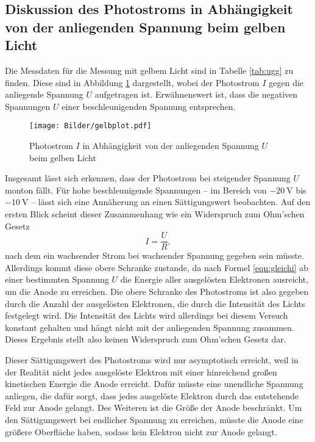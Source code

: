 \FloatBarrier
\subsection{Diskussion des Photostroms in Abhängigkeit von der anliegenden Spannung beim gelben Licht}

Die Messdaten für die Messung mit gelbem Licht sind in Tabelle \ref{tab:ugg} zu finden.
Diese sind in Abbildung \ref{fig:datayellow} dargestellt, wobei der Photostrom $I$ gegen die
anliegende Spannung $U$ aufgetragen ist. Erwähnenswert ist, dass die negativen Spannungen $U$
einer beschleunigenden Spannung entsprechen.
\begin{figure}
	\centering
	\caption{Photostrom $I$ in Abhängigkeit von der anliegenden Spannung $U$ beim gelben Licht}
	\label{fig:datayellow}
	\texttt{[image: Bilder/gelbplot.pdf]}
\end{figure}
Insgesamt lässt sich erkennen, dass der Photostrom bei steigender Spannung $U$ monton fällt.
Für hohe beschleunigende Spannungen -- im Bereich von $-\SI{20}{\volt}$ bis $-\SI{10}{\volt}$ --
lässt sich eine Annäherung an einen Sättigungswert beobachten. Auf den ersten Blick scheint 
dieser Zusammenhang wie ein Widerspruch zum Ohm'schen Gesetz
\begin{equation*}
	I = \frac{U}{R} \mathrm{,}
\end{equation*}
nach dem ein wachsender Strom bei wachsender Spannung gegeben sein müsste.
Allerdings kommt diese obere Schranke zustande, da nach Formel \eqref{eqn:gleichi} ab einer 
bestimmten Spannung $U$ die Energie aller ausgelösten Elektronen ausreicht, um die Anode zu 
erreichen. Die obere Schranke des Photostroms ist also gegeben durch die Anzahl der 
ausgelösten Elektronen, die durch die Intensität des Lichts festgelegt wird. Die Intensität 
des Lichts wird allerdings bei diesem Versuch konstant gehalten und hängt nicht mit der 
anliegenden Spannung zusammen. Dieses Ergebnis stellt also keinen Widerspruch zum 
Ohm'schen Gesetz dar.

Dieser Sättigungswert des Photostroms wird nur asymptotisch erreicht, weil in der Realität
nicht jedes ausgelöste Elektron mit einer hinreichend großen kinetischen Energie die Anode 
erreicht. Dafür müsste eine unendliche Spannung anliegen, die dafür sorgt, dass jedes 
ausgelöste Elektron durch das entstehende Feld zur Anode gelangt. Des Weiteren ist die 
Größe der Anode beschränkt.
Um den Sättigungswert bei endlicher Spannung zu erreichen, müsste die Anode eine größere 
Oberfläche haben, sodass kein Elektron nicht zur Anode gelangt.

